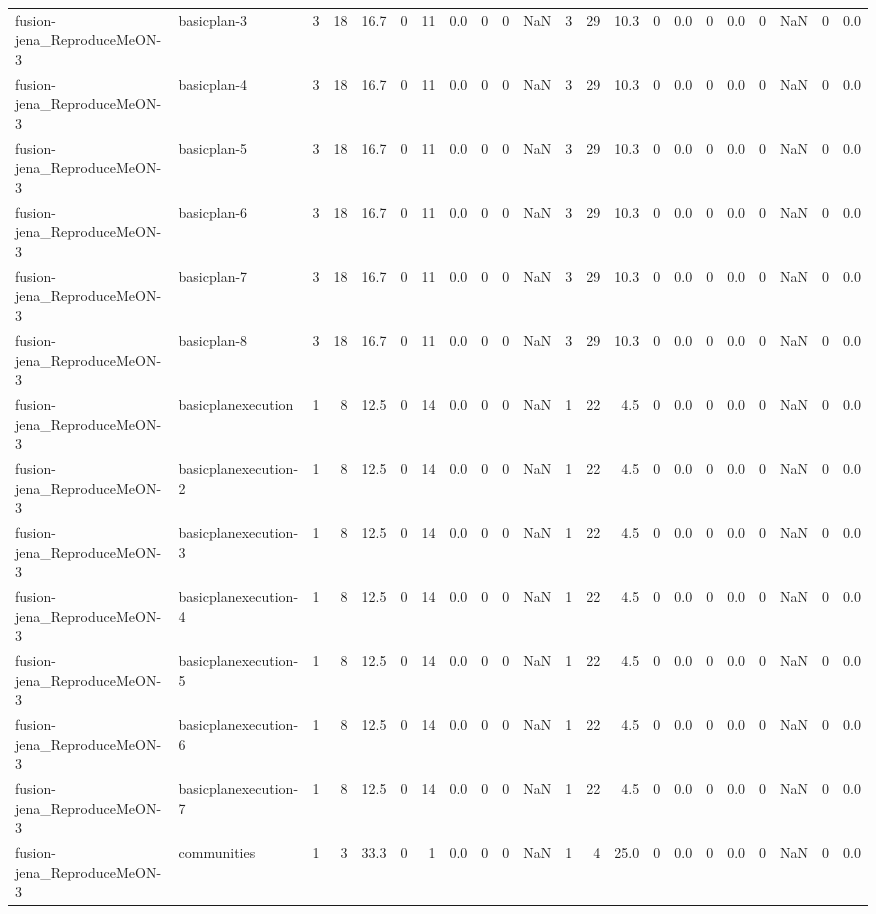 \begin{tabular}{llrrrrrrrrrrrrrrrrrrrr}
fusion-jena_ReproduceMeON-3 & basicplan-3 & 3 & 18 & 16.7 & 0 & 11 & 0.0 & 0 & 0 & NaN & 3 & 29 & 10.3 & 0 & 0.0 & 0 & 0.0 & 0 & NaN & 0 & 0.0 \\
fusion-jena_ReproduceMeON-3 & basicplan-4 & 3 & 18 & 16.7 & 0 & 11 & 0.0 & 0 & 0 & NaN & 3 & 29 & 10.3 & 0 & 0.0 & 0 & 0.0 & 0 & NaN & 0 & 0.0 \\
fusion-jena_ReproduceMeON-3 & basicplan-5 & 3 & 18 & 16.7 & 0 & 11 & 0.0 & 0 & 0 & NaN & 3 & 29 & 10.3 & 0 & 0.0 & 0 & 0.0 & 0 & NaN & 0 & 0.0 \\
fusion-jena_ReproduceMeON-3 & basicplan-6 & 3 & 18 & 16.7 & 0 & 11 & 0.0 & 0 & 0 & NaN & 3 & 29 & 10.3 & 0 & 0.0 & 0 & 0.0 & 0 & NaN & 0 & 0.0 \\
fusion-jena_ReproduceMeON-3 & basicplan-7 & 3 & 18 & 16.7 & 0 & 11 & 0.0 & 0 & 0 & NaN & 3 & 29 & 10.3 & 0 & 0.0 & 0 & 0.0 & 0 & NaN & 0 & 0.0 \\
fusion-jena_ReproduceMeON-3 & basicplan-8 & 3 & 18 & 16.7 & 0 & 11 & 0.0 & 0 & 0 & NaN & 3 & 29 & 10.3 & 0 & 0.0 & 0 & 0.0 & 0 & NaN & 0 & 0.0 \\
fusion-jena_ReproduceMeON-3 & basicplanexecution & 1 & 8 & 12.5 & 0 & 14 & 0.0 & 0 & 0 & NaN & 1 & 22 & 4.5 & 0 & 0.0 & 0 & 0.0 & 0 & NaN & 0 & 0.0 \\
fusion-jena_ReproduceMeON-3 & basicplanexecution-2 & 1 & 8 & 12.5 & 0 & 14 & 0.0 & 0 & 0 & NaN & 1 & 22 & 4.5 & 0 & 0.0 & 0 & 0.0 & 0 & NaN & 0 & 0.0 \\
fusion-jena_ReproduceMeON-3 & basicplanexecution-3 & 1 & 8 & 12.5 & 0 & 14 & 0.0 & 0 & 0 & NaN & 1 & 22 & 4.5 & 0 & 0.0 & 0 & 0.0 & 0 & NaN & 0 & 0.0 \\
fusion-jena_ReproduceMeON-3 & basicplanexecution-4 & 1 & 8 & 12.5 & 0 & 14 & 0.0 & 0 & 0 & NaN & 1 & 22 & 4.5 & 0 & 0.0 & 0 & 0.0 & 0 & NaN & 0 & 0.0 \\
fusion-jena_ReproduceMeON-3 & basicplanexecution-5 & 1 & 8 & 12.5 & 0 & 14 & 0.0 & 0 & 0 & NaN & 1 & 22 & 4.5 & 0 & 0.0 & 0 & 0.0 & 0 & NaN & 0 & 0.0 \\
fusion-jena_ReproduceMeON-3 & basicplanexecution-6 & 1 & 8 & 12.5 & 0 & 14 & 0.0 & 0 & 0 & NaN & 1 & 22 & 4.5 & 0 & 0.0 & 0 & 0.0 & 0 & NaN & 0 & 0.0 \\
fusion-jena_ReproduceMeON-3 & basicplanexecution-7 & 1 & 8 & 12.5 & 0 & 14 & 0.0 & 0 & 0 & NaN & 1 & 22 & 4.5 & 0 & 0.0 & 0 & 0.0 & 0 & NaN & 0 & 0.0 \\
fusion-jena_ReproduceMeON-3 & communities & 1 & 3 & 33.3 & 0 & 1 & 0.0 & 0 & 0 & NaN & 1 & 4 & 25.0 & 0 & 0.0 & 0 & 0.0 & 0 & NaN & 0 & 0.0 \\

\end{tabular}
